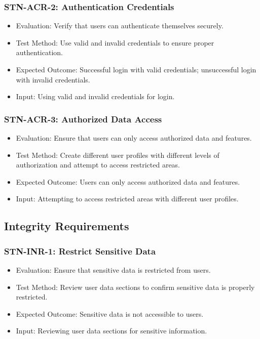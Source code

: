 \documentclass[12pt, titlepage]{article}
\begin{document}
\subsubsection{STN-ACR-2: Authentication Credentials}
\begin{itemize}
    \item Evaluation: Verify that users can authenticate themselves securely.
    \item Test Method: Use valid and invalid credentials to ensure proper authentication.
    \item Expected Outcome: Successful login with valid credentials; unsuccessful login with invalid credentials.
    \item Input: Using valid and invalid credentials for login.
\end{itemize}

\subsubsection{STN-ACR-3: Authorized Data Access}
\begin{itemize}
    \item Evaluation: Ensure that users can only access authorized data and features.
    \item Test Method: Create different user profiles with different levels of authorization and attempt to access restricted areas.
    \item Expected Outcome: Users can only access authorized data and features.
    \item Input: Attempting to access restricted areas with different user profiles.
\end{itemize}

\subsection{Integrity Requirements}

\subsubsection{STN-INR-1: Restrict Sensitive Data}
\begin{itemize}
    \item Evaluation: Ensure that sensitive data is restricted from users.
    \item Test Method: Review user data sections to confirm sensitive data is properly restricted.
    \item Expected Outcome: Sensitive data is not accessible to users.
    \item Input: Reviewing user data sections for sensitive information.
\end{itemize}
\end{document}
